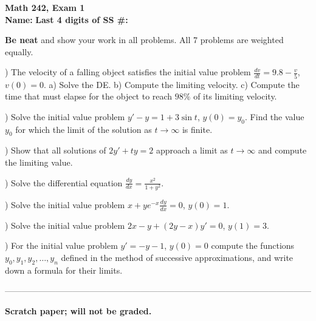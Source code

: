 \documentclass[12pt]{amsart}
\begin{document}
\noindent
{\bf Math 242, Exam 1}\\
{\bf  Name:} \hskip 3in {\bf Last 4 digits of SS \#:}

\noindent
{\bf Be neat} and show your work in all problems. All 7 problems are weighted
equally.

) The velocity of a falling object satisfies the initial value problem
$\frac{dv}{dt}= 9.8- \frac{v}{5}$, $v(0)=0$. a) Solve the DE. b) Compute the limiting
velocity. c) Compute the time that must elapse for the object to reach $98 \%$ of its 
limiting velocity.

\vskip 4.5in

) Solve the initial value problem $y'-y= 1+ 3 \sin t$, $y(0)=y_0$. Find the value $y_0$ 
for which the limit of the solution as $t \to \infty$ is finite.


\vskip 4.5in

) Show that all solutions of $2y'+ty =2$ approach a limit as $t \to \infty$ and compute the 
limiting value.
\vskip 4.5in

) Solve the differential equation $\frac{dy}{dx}= \frac{x^2}{1+y^2}$.
\vskip 4.5in

) Solve the initial value problem $x + ye^{-x} \frac{dy}{dx}=0$, $y(0)=1$.

\vskip 4.5in

) Solve the initial value problem $2x-y +(2y-x)y'=0$, $y(1)=3$.

\vskip 4.5in

) For the initial value problem $y'=-y-1$, $y(0)=0$ compute the functions
$y_0, y_1, y_2, \ldots , y_n$ defined in the method of successive approximations,
and write down a formula for their limits.

\vskip 4.5in


\noindent
------------------------------------------------------------------------------------------------------------

\noindent
{\bf Scratch paper; will not be graded.}
\end{document}
